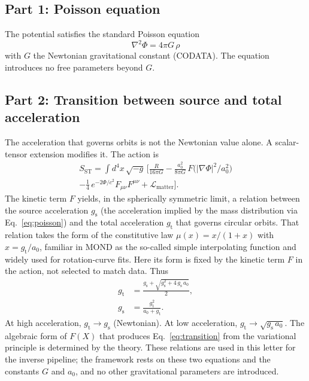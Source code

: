 \documentclass[fleqn,usenatbib]{mnras}
\begin{document}
\subsection{Part 1: Poisson equation}
The potential satisfies the standard Poisson equation
\begin{equation}
\nabla^2 \Phi = 4\pi G\,\rho
\label{eq:poisson}
\end{equation}
with $G$ the Newtonian gravitational constant (CODATA). The equation introduces no free parameters beyond $G$.

\subsection{Part 2: Transition between source and total acceleration}
The acceleration that governs orbits is not the Newtonian value alone. A scalar-tensor extension modifies it. The action is
\begin{equation}
\begin{split}
S_{\mathrm{ST}} = \int d^4 x\,\sqrt{-g}\,\bigg[ \frac{R}{16\pi G} - \frac{a_0^2}{8\pi G}\,F\big(|\nabla\Phi|^2/a_0^2\big)
\\
- \frac{1}{4}\,e^{-2\Phi/c^2}F_{\mu\nu}F^{\mu\nu} + \mathcal{L}_{\mathrm{matter}} \bigg].
\end{split}
\label{eq:action}
\end{equation}
The kinetic term $F$ yields, in the spherically symmetric limit, a relation between the source acceleration $g_{\mathrm{s}}$ (the acceleration implied by the mass distribution via Eq.~\ref{eq:poisson}) and the total acceleration $g_{\mathrm{t}}$ that governs circular orbits. That relation takes the form of the constitutive law $\mu(x) = x/(1+x)$ with $x = g_{\mathrm{t}}/a_0$, familiar in MOND as the so-called simple interpolating function and widely used for rotation-curve fits. Here its form is fixed by the kinetic term $F$ in the action, not selected to match data. Thus
\begin{align}
g_{\mathrm{t}} &= \frac{g_{\mathrm{s}} + \sqrt{g_{\mathrm{s}}^2 + 4\,g_{\mathrm{s}}\,a_0}}{2}, \\
g_{\mathrm{s}} &= \frac{g_{\mathrm{t}}^2}{a_0 + g_{\mathrm{t}}}.
\label{eq:transition}
\end{align}
At high acceleration, $g_{\mathrm{t}} \to g_{\mathrm{s}}$ (Newtonian). At low acceleration, $g_{\mathrm{t}} \to \sqrt{g_{\mathrm{s}}\,a_0}$. The algebraic form of $F(X)$ that produces Eq.~\ref{eq:transition} from the variational principle is determined by the theory. These relations are used in this letter for the inverse pipeline; the framework rests on these two equations and the constants $G$ and $a_0$, and no other gravitational parameters are introduced.
\end{document}

